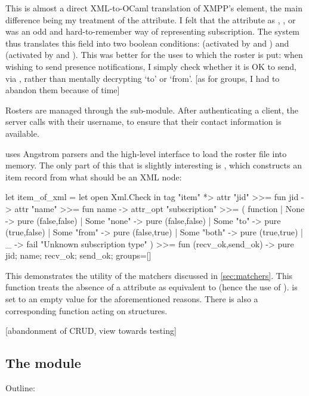 \documentclass[12pt,a4paper,twoside,openright]{report}
\begin{document}
{This is almost a direct XML-to-OCaml translation of XMPP's  element, the main difference being my treatment of the  attribute. I felt that the  attribute as , ,  or  was an odd and hard-to-remember way of representing subscription. The system thus translates this field into two boolean conditions:  (activated by  and ) and  (activated by  and ). This was better for the uses to which the roster is put: when wishing to send presence notifications, I simply check whether it is OK to send, via , rather than mentally decrypting `to' or `from'. [as for groups, I had to abandon them because of time]

Rosters are managed through the  sub-module. After authenticating a client, the server calls  with their username, to ensure that their contact information is available.

 uses Angstrom parsers and the high-level  interface to load the roster file into memory. The only part of this that is slightly interesting is , which constructs an item record from what should be an  XML node:

\begin{ocaml}
let item_of_xml =
  let open Xml.Check in
  tag "item" *> attr "jid" >>= fun jid ->
    attr "name" >>= fun name ->
      attr_opt "subscription" >>= ( function
      | None        -> pure (false,false)
      | Some "none" -> pure (false,false)
      | Some "to"   -> pure (true,false)
      | Some "from" -> pure (false,true)
      | Some "both" -> pure (true,true)
      | _ -> fail "Unknown subscription type" ) >>=
  fun (recv_ok,send_ok) ->
    pure { jid; name; recv_ok; send_ok; groups=[] }
\end{ocaml}

This demonstrates the utility of the  matchers discussed in \ref{sec:matchers}. This function treats the absence of a  attribute as equivalent to  (hence the use of ).  is set to an empty value for the aforementioned reasons. There is also a corresponding  function acting on  structures.

[abandonment of CRUD, view towards testing]

\subsection{The  module}
Outline:

}
\end{document}
